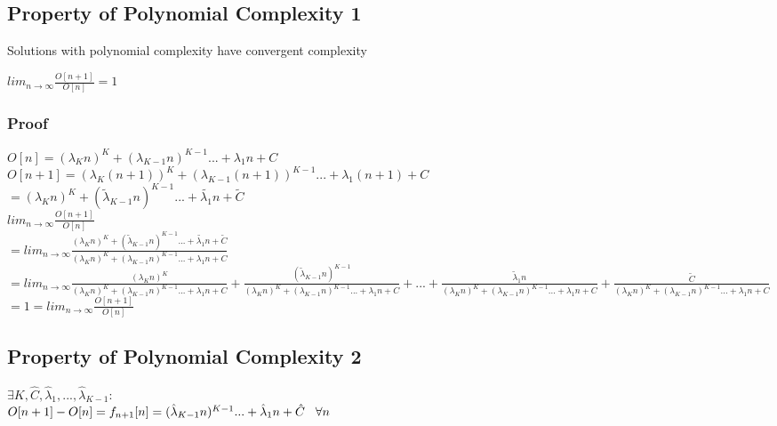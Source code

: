 \documentclass[11pt]{article}
\begin{document}
\subsection{Property of Polynomial  Complexity 1}
Solutions with polynomial complexity have convergent complexity
\begin{center}
$
lim_{n \rightarrow \infty} \frac{O[n+1]}{O[n]} = 1
$
\end{center}
\subsubsection{Proof}
\begin{center}
$
O[n] = (\lambda_K n)^K + (\lambda_{K-1} n)^{K-1}... + \lambda_1 n + C
$
\\ \vspace{2mm}
$
O[n+1] = (\lambda_K (n+1))^K + (\lambda_{K-1} (n+1))^{K-1}... + \lambda_1 (n+1) + C
$
\\ \vspace{2mm}
$ 
=  (\lambda_K n)^K + (\tilde{\lambda}_{K-1} n)^{K-1}... + \tilde{\lambda_1} n + \tilde{C}
$
\\ \vspace{5mm}
$
lim_{n \rightarrow \infty} \frac{O[n+1]}{O[n]}
$
\\ \vspace{3mm}
$
= lim_{n \rightarrow \infty} \frac{ (\lambda_K n)^K + (\tilde{\lambda}_{K-1} n)^{K-1}... + \tilde{\lambda_1} n + \tilde{C}}{(\lambda_K n)^K + (\lambda_{K-1} n)^{K-1}... + \lambda_1 n + C}
$
\\ \vspace{3mm}
$
= lim_{n \rightarrow \infty} \frac{ (\lambda_K n)^K}{(\lambda_K n)^K + (\lambda_{K-1} n)^{K-1}... + \lambda_1 n + C} + \frac{ (\tilde{\lambda}_{K-1} n)^{K-1}}{(\lambda_K n)^K + (\lambda_{K-1} n)^{K-1}... + \lambda_1 n + C} + ... + \frac{ \tilde{\lambda}_1 n}{(\lambda_K n)^K + (\lambda_{K-1} n)^{K-1}... + \lambda_1 n + C} +  \frac{ \tilde{C}}{(\lambda_K n)^K + (\lambda_{K-1} n)^{K-1}... + \lambda_1 n + C}
$
\\ \vspace{3mm}
$
= 1 = lim_{n \rightarrow \infty} \frac{O[n+1]}{O[n]}
$
\end{center}







\subsection{Property of Polynomial Complexity 2}
\vspace{1mm}
\begin{center}
$
\exists K,\hat{C},\hat{\lambda}_1,...,\hat{\lambda}_{K-1} :
$
\\ \vspace{2mm}
$
O[n+1] - O[n] = f_{n+1}[n] = (\hat{\lambda}_{K-1} n)^{K-1}... + \hat{\lambda}_1 n + \hat{C} \hspace{3mm} \forall n
$
\end{center}
\end{document}
